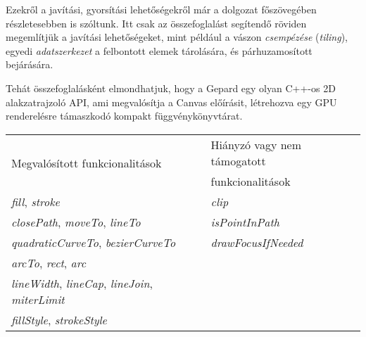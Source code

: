 \documentclass[12pt]{report}
\theoremstyle{definition}
\newcommand{\inenglish}[1]{\textsl{#1}}
\newcommand{\func}[1]{{\textsl{#1}}}
\begin{document}
Ezekről a javítási, gyorsítási lehetőségekről már a dolgozat főszövegében
részletesebben is szóltunk. Itt csak az összefoglalást segítendő röviden
megemlítjük a javítási lehetőségeket, mint például a vászon \emph{csempézése}
(\inenglish{tiling}), egyedi \emph{adatszerkezet} a felbontott elemek
tárolására, és párhuzamosított bejárására.

Tehát összefoglalásként elmondhatjuk, hogy a Gepard egy olyan C++-os 2D
alakzatrajzoló API, ami megvalósítja a Canvas előírásit, létrehozva egy GPU
renderelésre támaszkodó kompakt függvénykönyvtárat.

  \begin{table}[b]
    \label{tab:functions}
    \renewcommand*{\arraystretch}{1.2}
    \centering
    \begin{tabular}{|l|l|}
      \hline
      \multirow{2}{*}{Megvalósított funkcionalitások} & Hiányzó vagy nem
      támogatott \\
      & funkcionalitások \\
      \hline \hline
      \func{fill}, \func{stroke} & \func{clip} \\ \cline{1-1}
      \func{closePath}, \func{moveTo}, \func{lineTo}  & \func{isPointInPath} \\
      \cline{2-2}
      \func{quadraticCurveTo}, \func{bezierCurveTo} & \func{drawFocusIfNeeded}
      \\
      \func{arcTo}, \func{rect}, \func{arc} &  \\ \cline{1-1}
      \func{lineWidth}, \func{lineCap}, \func{lineJoin}, \func{miterLimit} & \\
      \func{fillStyle}, \func{strokeStyle} &  \\
      \hline
    \end{tabular}
  \end{table}



  \nocite{Munshi:2008:OEP:1481069}
  \nocite{Foley:1990:CGP:83821}
  \nocite{Brinza:18:SVG}
  \nocite{Strachey2000}
  {}
  
\end{document}
